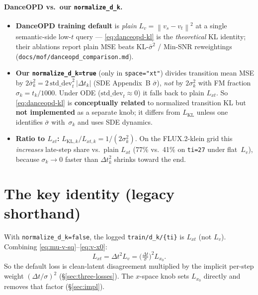 \documentclass[11pt,a4paper]{article}
\newcommand{\norm}[1]{\left\lVert #1 \right\rVert}
\newcommand{\dt}{\Delta t}
\begin{document}
\paragraph{DanceOPD vs.\ our \texttt{normalize\_d\_k}.}
\begin{itemize}[leftmargin=1.5em]
\item \textbf{DanceOPD training default} is \emph{plain} $L_v=\norm{v_s-v_t}^2$ at a single
semantic-side low-$t$ query --- \eqref{eq:danceopd-kl} is the \emph{theoretical} KL identity; their
ablations report plain MSE beats KL-$\bar\sigma^2$ / Min-SNR reweightings
(\texttt{docs/mof/danceopd\_comparison.md}).
\item \textbf{Our \texttt{normalize\_d\_k=true}} (only in \texttt{space="xt"}) divides transition
mean MSE by $2\bar\sigma_k^2=2\,\mathrm{std\_dev}_t^2\,\lvert\dt_k\rvert$ (SDE Appendix~B
$\bar\sigma$), \emph{not} by $2\sigma_k^2$ with FM fraction~$\sigma_k=t_k/1000$. Under ODE
($\mathrm{std\_dev}_t\approx0$) it falls back to plain $L_{xt}$. So \eqref{eq:danceopd-kl} is
\textbf{conceptually related} to normalized transition KL but \textbf{not implemented} as a separate
knob; it differs from $L_{\mathrm{KL}}$ unless one identifies $\bar\sigma$ with~$\sigma_k$ and uses
SDE dynamics.
\item \textbf{Ratio to $L_{xt}$:} $L_{\mathrm{KL},k}/L_{xt,k}=1/(2\sigma_k^2)$. On the FLUX.2-klein
grid this \emph{increases} late-step share vs.\ plain $L_{xt}$ (77\% vs.\ 41\% on \texttt{ti=27}
under flat~$L_v$), because $\sigma_k\to0$ faster than $\dt_k^2$ shrinks toward the end.
\end{itemize}

\section{The key identity (legacy shorthand)}
\label{sec:identity}

With \texttt{normalize\_d\_k=false}, the logged \texttt{train/d\_k/\{ti\}} is $L_{xt}$ (not $L_v$).
Combining \eqref{eq:mu-v-sq}--\eqref{eq:v-x0}:
\[
L_{xt} = \dt^2 L_v = \Big(\tfrac{\dt}{\sigma}\Big)^2 L_{x_0}.
\]
So the default loss is clean-latent disagreement multiplied by the implicit per-step weight
$(\dt/\sigma)^2$ (\S\ref{sec:three-losses}). The $x$-space knob sets $L_{x_0}$ directly and removes
that factor (\S\ref{sec:impl}).

\end{document}
